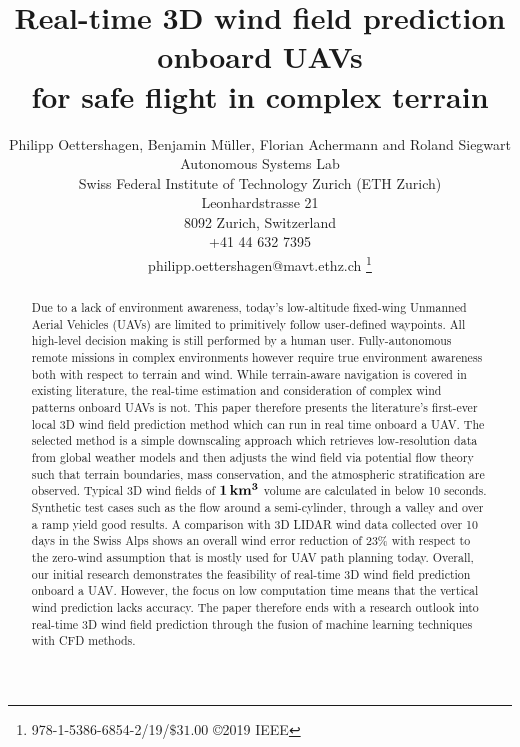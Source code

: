 \documentclass[twocolumn,letterpaper]{IEEEAerospaceCLS}
\begin{document}
\title{Real-time 3D wind field prediction onboard UAVs \\for safe flight in complex terrain}

\author{%
Philipp Oettershagen, Benjamin M{\"u}ller, Florian Achermann and Roland Siegwart\\ 
Autonomous Systems Lab\\
Swiss Federal Institute of Technology Zurich (ETH Zurich)\\
Leonhardstrasse 21\\ 
8092 Zurich, Switzerland\\
+41 44 632 7395\\
philipp.oettershagen@mavt.ethz.ch
\thanks{\footnotesize 978-1-5386-6854-2/19/$\$31.00$ \copyright2019 IEEE}              %
}

%

\maketitle

\thispagestyle{plain}
\pagestyle{plain}

\begin{abstract}
Due to a lack of environment awareness, today's low-altitude fixed-wing Unmanned Aerial Vehicles (UAVs) are limited to primitively follow user-defined waypoints. All high-level decision making is still performed by a human user. Fully-autonomous remote missions in complex environments however require true environment awareness both with respect to terrain and wind. While terrain-aware navigation is covered in existing literature, the real-time estimation and consideration of complex wind patterns onboard UAVs is not. This paper therefore presents the literature's first-ever local 3D wind field prediction method which can run in real time onboard a UAV. The selected method is a simple downscaling approach which retrieves low-resolution data from global weather models and then adjusts the wind field via potential flow theory such that terrain boundaries, mass conservation, and the atmospheric stratification are observed. Typical 3D wind fields of $\mathbf{\unit[1]{\mathbf{km^3}}}$ volume are calculated in below 10 seconds. Synthetic test cases such as the flow around a semi-cylinder, through a valley and over a ramp yield good results. A comparison with 3D LIDAR wind data collected over 10 days in the Swiss Alps shows an overall wind error reduction of 23\% with respect to the zero-wind assumption that is mostly used for UAV path planning today. Overall, our initial research demonstrates the feasibility of real-time 3D wind field prediction onboard a UAV. However, the focus on low computation time means that the vertical wind prediction lacks accuracy. The paper therefore ends with a research outlook into real-time 3D wind field prediction through the fusion of machine learning techniques with \ac{CFD} methods.
\end{abstract}
\end{document}
